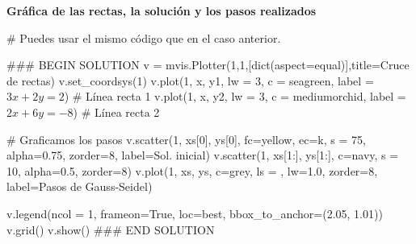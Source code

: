 \documentclass[
  letterpaper,
  DIV=11,
  numbers=noendperiod]{scrreprt}
\newenvironment{Shaded}{\begin{snugshade}}{\end{snugshade}}
\newcommand{\BuiltInTok}[1]{\textcolor[rgb]{0.00,0.23,0.31}{#1}}
\newcommand{\CommentTok}[1]{\textcolor[rgb]{0.37,0.37,0.37}{#1}}
\newcommand{\DecValTok}[1]{\textcolor[rgb]{0.68,0.00,0.00}{#1}}
\newcommand{\FloatTok}[1]{\textcolor[rgb]{0.68,0.00,0.00}{#1}}
\newcommand{\NormalTok}[1]{\textcolor[rgb]{0.00,0.23,0.31}{#1}}
\newcommand{\OperatorTok}[1]{\textcolor[rgb]{0.37,0.37,0.37}{#1}}
\newcommand{\RegionMarkerTok}[1]{\textcolor[rgb]{0.00,0.23,0.31}{#1}}
\newcommand{\StringTok}[1]{\textcolor[rgb]{0.13,0.47,0.30}{#1}}
\newcommand{\VariableTok}[1]{\textcolor[rgb]{0.07,0.07,0.07}{#1}}
\begin{document}
\textbf{Gráfica de las rectas, la solución y los pasos realizados}

\begin{Shaded}
\begin{Highlighting}[]
\CommentTok{\# Puedes usar el mismo código que en el caso anterior.}

\CommentTok{\#\#\# }\RegionMarkerTok{BEGIN}\CommentTok{ SOLUTION}
\NormalTok{v }\OperatorTok{=}\NormalTok{ mvis.Plotter(}\DecValTok{1}\NormalTok{,}\DecValTok{1}\NormalTok{,[}\BuiltInTok{dict}\NormalTok{(aspect}\OperatorTok{=}\StringTok{\textquotesingle{}equal\textquotesingle{}}\NormalTok{)],title}\OperatorTok{=}\StringTok{\textquotesingle{}Cruce de rectas\textquotesingle{}}\NormalTok{) }
\NormalTok{v.set\_coordsys(}\DecValTok{1}\NormalTok{)}
\NormalTok{v.plot(}\DecValTok{1}\NormalTok{, x, y1, lw }\OperatorTok{=} \DecValTok{3}\NormalTok{, c }\OperatorTok{=} \StringTok{\textquotesingle{}seagreen\textquotesingle{}}\NormalTok{, label }\OperatorTok{=} \StringTok{\textquotesingle{}$3x+2y=2$\textquotesingle{}}\NormalTok{) }\CommentTok{\# Línea recta 1}
\NormalTok{v.plot(}\DecValTok{1}\NormalTok{, x, y2, lw }\OperatorTok{=} \DecValTok{3}\NormalTok{, c }\OperatorTok{=} \StringTok{\textquotesingle{}mediumorchid\textquotesingle{}}\NormalTok{, label }\OperatorTok{=} \StringTok{\textquotesingle{}$2x+6y={-}8$\textquotesingle{}}\NormalTok{) }\CommentTok{\# Línea recta 2}

\CommentTok{\# Graficamos los pasos}
\NormalTok{v.scatter(}\DecValTok{1}\NormalTok{, xs[}\DecValTok{0}\NormalTok{], ys[}\DecValTok{0}\NormalTok{], fc}\OperatorTok{=}\StringTok{\textquotesingle{}yellow\textquotesingle{}}\NormalTok{, ec}\OperatorTok{=}\StringTok{\textquotesingle{}k\textquotesingle{}}\NormalTok{, s }\OperatorTok{=} \DecValTok{75}\NormalTok{, alpha}\OperatorTok{=}\FloatTok{0.75}\NormalTok{, zorder}\OperatorTok{=}\DecValTok{8}\NormalTok{, label}\OperatorTok{=}\StringTok{\textquotesingle{}Sol. inicial\textquotesingle{}}\NormalTok{)}
\NormalTok{v.scatter(}\DecValTok{1}\NormalTok{, xs[}\DecValTok{1}\NormalTok{:], ys[}\DecValTok{1}\NormalTok{:], c}\OperatorTok{=}\StringTok{\textquotesingle{}navy\textquotesingle{}}\NormalTok{, s }\OperatorTok{=} \DecValTok{10}\NormalTok{, alpha}\OperatorTok{=}\FloatTok{0.5}\NormalTok{, zorder}\OperatorTok{=}\DecValTok{8}\NormalTok{)}
\NormalTok{v.plot(}\DecValTok{1}\NormalTok{, xs, ys, c}\OperatorTok{=}\StringTok{\textquotesingle{}grey\textquotesingle{}}\NormalTok{, ls }\OperatorTok{=} \StringTok{\textquotesingle{}{-}{-}\textquotesingle{}}\NormalTok{, lw}\OperatorTok{=}\FloatTok{1.0}\NormalTok{, zorder}\OperatorTok{=}\DecValTok{8}\NormalTok{, label}\OperatorTok{=}\StringTok{\textquotesingle{}Pasos de Gauss{-}Seidel\textquotesingle{}}\NormalTok{)}

\NormalTok{v.legend(ncol }\OperatorTok{=} \DecValTok{1}\NormalTok{, frameon}\OperatorTok{=}\VariableTok{True}\NormalTok{, loc}\OperatorTok{=}\StringTok{\textquotesingle{}best\textquotesingle{}}\NormalTok{, bbox\_to\_anchor}\OperatorTok{=}\NormalTok{(}\FloatTok{2.05}\NormalTok{, }\FloatTok{1.01}\NormalTok{))}
\NormalTok{v.grid()}
\NormalTok{v.show()}
\CommentTok{\#\#\# }\RegionMarkerTok{END}\CommentTok{ SOLUTION}
\end{Highlighting}
\end{Shaded}
\end{document}
